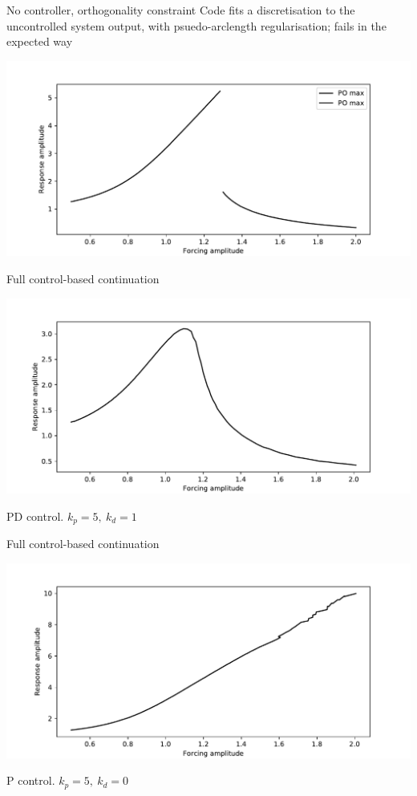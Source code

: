\documentclass[presentation]{beamer}
\begin{document}
\begin{frame}[label={sec:org3c171e0}]{No controller, orthogonality constraint}
Code fits a discretisation to the uncontrolled system output, with psuedo-arclength regularisation; fails in the expected way

\begin{center}
\includegraphics[width=.9\linewidth]{./controlfree_continuation.pdf}
\end{center}
\end{frame}

\begin{frame}[label={sec:orgcd7a4e0}]{Full control-based continuation}
\begin{center}
\includegraphics[width=.9\linewidth]{./failed_duffing.pdf}
\end{center}

PD control. \(k_p=5,~k_d=1\)
\end{frame}

\begin{frame}[label={sec:org8feab02}]{Full control-based continuation}
\begin{center}
\includegraphics[width=.9\linewidth]{./p-only-failed_CBC.pdf}
\end{center}

P control. \(k_p=5,~k_d=0\)
\end{frame}
\end{document}
